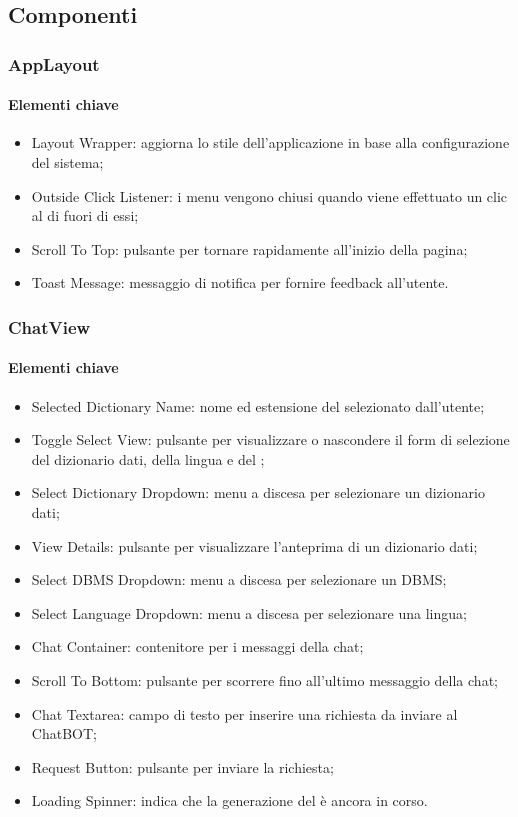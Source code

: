\subsection{Componenti} \label{Componenti}

\subsubsection{AppLayout}

\paragraph*{Elementi chiave}
\begin{itemize}
  \item Layout Wrapper: aggiorna lo stile dell'applicazione in base alla configurazione del sistema;
  \item Outside Click Listener: i menu vengono chiusi quando viene effettuato un clic al di fuori di essi;
  \item Scroll To Top: pulsante per tornare rapidamente all'inizio della pagina;
  \item Toast Message: messaggio di notifica per fornire feedback all'utente.
\end{itemize}

\subsubsection{ChatView}

\paragraph*{Elementi chiave}
\begin{itemize}
  \item Selected Dictionary Name: nome ed estensione del  selezionato dall'utente;
  \item Toggle Select View: pulsante per visualizzare o nascondere il form di selezione del dizionario dati, della lingua e del ;
  \item Select Dictionary Dropdown: menu a discesa per selezionare un dizionario dati;
  \item View Details: pulsante per visualizzare l'anteprima di un dizionario dati;
  \item Select DBMS Dropdown: menu a discesa per selezionare un DBMS;
  \item Select Language Dropdown: menu a discesa per selezionare una lingua;
  \item Chat Container: contenitore per i messaggi della chat;
  \item Scroll To Bottom: pulsante per scorrere fino all'ultimo messaggio della chat;
  \item Chat Textarea: campo di testo per inserire una richiesta da inviare al ChatBOT;
  \item Request Button: pulsante per inviare la richiesta;
  \item Loading Spinner: indica che la generazione del  è ancora in corso.
\end{itemize}

